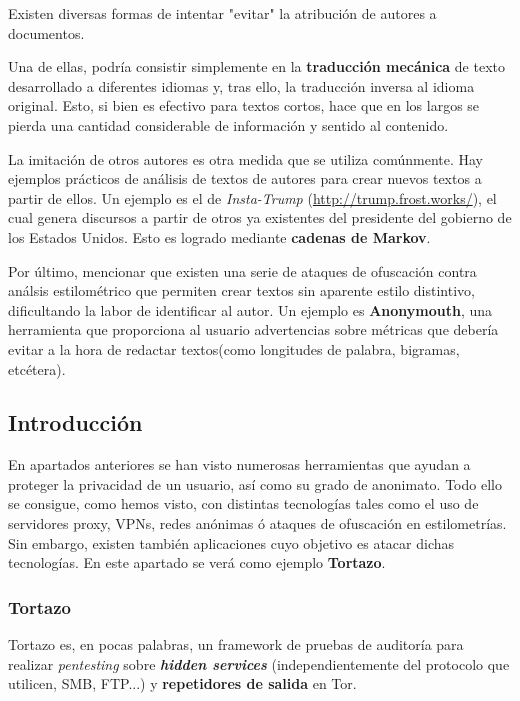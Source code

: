 Existen diversas formas de intentar "evitar" la atribución de autores a documentos. 

Una de ellas, podría consistir simplemente en la \textbf{traducción mecánica} de texto desarrollado a diferentes idiomas y, tras ello, la traducción inversa al idioma original. Esto, si bien es efectivo para textos cortos, hace que en los largos se pierda una cantidad considerable de información y sentido al contenido.

La imitación de otros autores es otra medida que se utiliza comúnmente. Hay ejemplos prácticos de análisis de textos de autores para crear nuevos textos a partir de ellos. Un ejemplo es el de \textit{Insta-Trump} (\url{http://trump.frost.works/}), el cual genera discursos a partir de otros ya existentes del presidente del gobierno de los Estados Unidos. Esto es logrado mediante \textbf{cadenas de Markov}.

Por último, mencionar que existen una serie de ataques de ofuscación contra análsis estilométrico que permiten crear textos sin aparente estilo distintivo, dificultando la labor de identificar al autor.
Un ejemplo es \textbf{Anonymouth}, una herramienta que proporciona al usuario advertencias sobre métricas que debería evitar a la hora de redactar textos(como longitudes de palabra, bigramas, etcétera).

 \label{sec:identificacion}
\subsection{Introducción}

En apartados anteriores se han visto numerosas herramientas que ayudan a proteger la privacidad de un usuario, así como su grado de anonimato. Todo ello se consigue, como hemos visto, con distintas tecnologías tales como el uso de servidores proxy, VPNs, redes anónimas ó ataques de ofuscación en estilometrías. 
Sin embargo, existen también aplicaciones cuyo objetivo es atacar dichas tecnologías. En este apartado se verá como ejemplo \textbf{Tortazo}.

\subsubsection{Tortazo}
Tortazo es, en pocas palabras, un framework de pruebas de auditoría para realizar \textit{pentesting} sobre \textit{\textbf{hidden services}} (independientemente del protocolo que utilicen, SMB, FTP...) y \textbf{repetidores de salida} en Tor.

